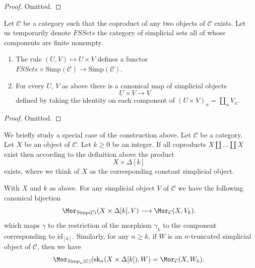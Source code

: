 \begin{proof}
Omitted.
\end{proof}

\begin{lemma}
\label{lemma-back-to-U}
Let $\mathcal{C}$ be a category such that the coproduct of
any two objects of $\mathcal{C}$ exists. Let us temporarily
denote $\textit{FSSets}$ the category of simplicial sets
all of whose components are finite nonempty.
\begin{enumerate}
\item The rule $(U, V) \mapsto U \times V$
defines a functor
$\textit{FSSets} \times \text{Simp}(\mathcal{C})
\to \text{Simp}(\mathcal{C})$.
\item For every $U$, $V$ as above
there is a canonical map of simplicial objects
$$
U \times V \longrightarrow V
$$
defined by taking the identity on each component of
$(U \times V)_n = \coprod_u V_n$.
\end{enumerate}
\end{lemma}

\begin{proof}
Omitted.
\end{proof}

\noindent
We briefly study a special case of the construction
above. Let $\mathcal{C}$ be a category.
Let $X$ be an object of $\mathcal{C}$.
Let $k \geq 0$ be an integer.
If all coproducts $X \amalg \ldots \amalg X$ exist
then according to the definition above the product
$$
X \times \Delta[k]
$$
exists, where we think of $X$ as the corresponding constant
simplicial object.

\begin{lemma}
\label{lemma-morphism-from-coproduct}
With $X$ and $k$ as above.
For any simplicial object $V$ of
$\mathcal{C}$ we have the following
canonical bijection
$$
\Mor_{\text{Simp}(\mathcal{C})}(X \times \Delta[k], V)
\longrightarrow
\Mor_\mathcal{C}(X, V_k).
$$
which maps $\gamma$ to the restriction of the
morphism $\gamma_k$ to the component corresponding
to $\text{id}_{[k]}$.
Similarly, for any $n \geq k$, if $W$ is an
$n$-truncated simplicial object
of $\mathcal{C}$, then we have
$$
\Mor_{\text{Simp}_n(\mathcal{C})}(\text{sk}_n(X \times \Delta[k]), W)
=
\Mor_\mathcal{C}(X, W_k).
$$
\end{lemma}


